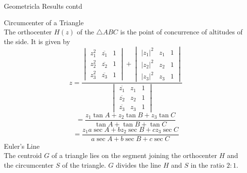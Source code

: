 \documentclass[aspectratio=169,8pt]{beamer}
\begin{document}
\begin{frame}[fragile]{Geometricla Results contd}

  {\large Circumcenter of a Triangle\\}
  \vspace*{0.2cm}
  The orthocenter $H(z)$ of the $\triangle ABC$ is the point of concurrence of altitudes of the side. It is given by
  $$z = \frac{\begin{vmatrix}z_1^2 & \overline{z_1} & 1\\z_2^2 & \overline{z_2} & 1\\z_3^2 & \overline{z_3} & 1\end{vmatrix} + \begin{vmatrix}|z_1|^2 & z_1 & 1\\|z_2|^2 & z_2 & 1\\|z_3|^2 & z_3 & 1\end{vmatrix}}{\begin{vmatrix}\overline{z_1} & z_1 & 1\\\overline{z_2} & z_2 & 1\\\overline{z_3} & z_3 & 1\end{vmatrix}}$$
  $$= \frac{z_1\tan A + z_2\tan B + z_3\tan C}{\tan A + \tan B + \tan C}$$
  $$= \frac{z_1a\sec A + bz_2\sec B + cz_3\sec C}{a\sec A + b\sec B + c\sec C}$$
  \vspace*{0.2cm}
  {\large Euler's Line\\}
  \vspace*{0.2cm}
  The centroid $G$ of a triangle lies on the segment joining the orthocenter $H$ and the circumcenter $S$ of the triangle. $G$ divides the line $H$ and $S$ in the ratio $2:1$.
\end{frame}
\end{document}
